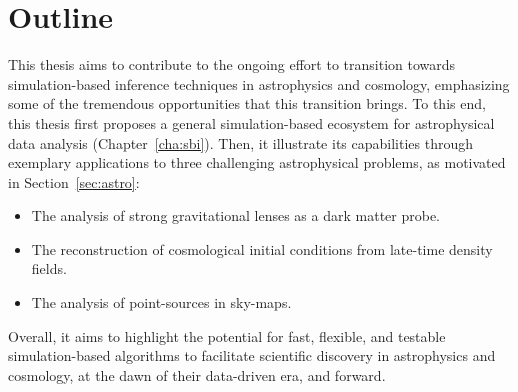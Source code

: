 \section{Outline}

This thesis aims to contribute to the ongoing effort to transition towards simulation-based inference techniques in astrophysics and cosmology, emphasizing some of the tremendous opportunities that this transition brings. To this end, this thesis first proposes a general simulation-based ecosystem for astrophysical data analysis (Chapter~\ref{cha:sbi}). Then, it illustrate its capabilities through exemplary applications to three challenging astrophysical problems, as motivated in Section~\ref{sec:astro}: 
\begin{itemize}[align=left, leftmargin=1cm]
	\item[{\makebox[3.2cm]{Chapters~\ref{cha:lensing} and \ref{cha:anre}: \hfill}}] The analysis of strong gravitational lenses as a dark matter {\makebox[2.45cm]{}} probe.
	\item[{\makebox[3.2cm]{Chapter~\ref{cha:cosmo}: \hfill}}] The reconstruction of cosmological initial conditions from late-{\makebox[2.45cm]{}}time density fields.
	\item[{\makebox[3.2cm]{Chapter~\ref{cha:detection}: \hfill}}] The analysis of point-sources in sky-maps. 
\end{itemize}
Overall, it aims to highlight the potential for fast, flexible, and testable simulation-based algorithms to facilitate scientific discovery in astrophysics and cosmology, at the dawn of their data-driven era, and forward.




